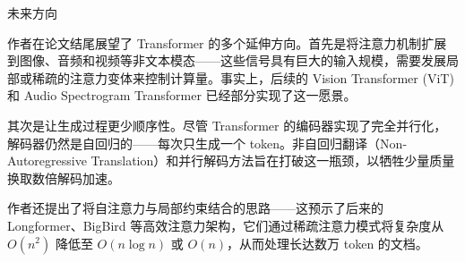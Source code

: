 \documentclass[10pt, aspectratio=169, noamsthm, t]{beamer}
\begin{document}
\begin{frame}{未来方向}

作者在论文结尾展望了 Transformer 的多个延伸方向。首先是将注意力机制扩展到\alert{图像、音频和视频}等非文本模态——这些信号具有巨大的输入规模，需要发展局部或稀疏的注意力变体来控制计算量。事实上，后续的 Vision Transformer (ViT) 和 Audio Spectrogram Transformer 已经部分实现了这一愿景。

\vskip0.2cm

其次是让生成过程\alert{更少顺序性}。尽管 Transformer 的编码器实现了完全并行化，解码器仍然是自回归的——每次只生成一个 token。非自回归翻译（Non-Autoregressive Translation）和并行解码方法旨在打破这一瓶颈，以牺牲少量质量换取数倍解码加速。

\vskip0.2cm

作者还提出了将自注意力与局部约束结合的思路——这预示了后来的 Longformer、BigBird 等高效注意力架构，它们通过稀疏注意力模式将复杂度从 $O(n^2)$ 降低至 $O(n\log n)$ 或 $O(n)$，从而处理长达数万 token 的文档。
\end{frame}

\end{document}
